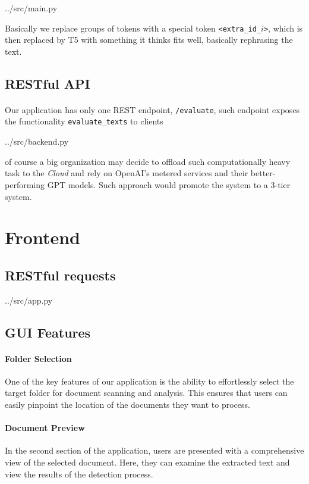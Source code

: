 
{../src/main.py}

Basically we replace groups of tokens with a special token \texttt{<extra\_id\_$i$>}, which is then replaced by T5 with something it thinks fits well, basically rephrasing the text.

\subsection{RESTful API}

\paragraph{}
Our application has only one REST endpoint, \texttt{/evaluate}, such endpoint exposes the functionality \texttt{evaluate\_texts} to clients


{../src/backend.py}

of course a big organization may decide to offload such computationally heavy task to the \textit{Cloud} and rely on OpenAI's metered services and their better-performing GPT models. Such approach would promote the system to a 3-tier system.

\section{Frontend}

\subsection{RESTful requests}


{../src/app.py}

\subsection{GUI Features}

\paragraph{Folder Selection} One of the key features of our application is the ability to effortlessly select the 
target folder for document scanning and analysis. This ensures that users can easily pinpoint the location of the 
documents they want to process.

\paragraph{Document Preview} In the second section of the application, users are presented with a comprehensive 
view of the selected document. Here, they can examine the extracted text and view the results of the detection process.

